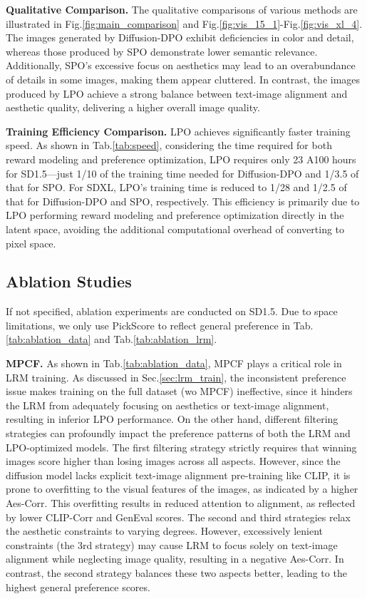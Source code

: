 \textbf{Qualitative Comparison.} The qualitative comparisons of various methods are illustrated in Fig.\;\ref{fig:main_comparison} and Fig.\;\ref{fig:vis_15_1}-Fig.\;\ref{fig:vis_xl_4}. The images generated by Diffusion-DPO exhibit deficiencies in color and detail, whereas those produced by SPO demonstrate lower semantic relevance. Additionally, SPO's excessive focus on aesthetics may lead to an overabundance of details in some images, making them appear cluttered. In contrast, the images produced by LPO achieve a strong balance between text-image alignment and aesthetic quality, delivering a higher overall image quality.


\textbf{Training Efficiency Comparison.} LPO achieves significantly faster training speed. As shown in Tab.\;\ref{tab:speed}, considering the time required for both reward modeling and preference optimization, LPO requires only 23 A100 hours for SD1.5---just 1/10 of the training time needed for Diffusion-DPO and 1/3.5 of that for SPO. For SDXL, LPO's training time is reduced to 1/28 and 1/2.5 of that for Diffusion-DPO and SPO, respectively. This efficiency is primarily due to LPO performing reward modeling and preference optimization directly in the latent space, avoiding the additional computational overhead of converting to pixel space.

\subsection{Ablation Studies}
\label{sec:ablation_study}
If not specified, ablation experiments are conducted on SD1.5. Due to space limitations, we only use PickScore to reflect general preference in Tab.\;\ref{tab:ablation_data} and Tab.\;\ref{tab:ablation_lrm}.


\textbf{MPCF.} As shown in Tab.\;\ref{tab:ablation_data}, MPCF plays a critical role in LRM training. As discussed in Sec.\;\ref{sec:lrm_train}, the inconsistent preference issue makes training on the full dataset (wo MPCF) ineffective, since it hinders the LRM from adequately focusing on aesthetics or text-image alignment, resulting in inferior LPO performance. On the other hand, different filtering strategies can profoundly impact the preference patterns of both the LRM and LPO-optimized models. The first filtering strategy strictly requires that winning images score higher than losing images across all aspects. However, since the diffusion model lacks explicit text-image alignment pre-training like CLIP, it is prone to overfitting to the visual features of the images, as indicated by a higher Aes-Corr. This overfitting results in reduced attention to alignment, as reflected by lower CLIP-Corr and GenEval scores. The second and third strategies relax the aesthetic constraints to varying degrees. However, excessively lenient constraints (the 3rd strategy) may cause LRM to focus solely on text-image alignment while neglecting image quality, resulting in a negative Aes-Corr. In contrast, the second strategy balances these two aspects better, leading to the highest general preference scores.



